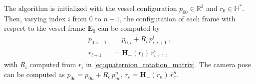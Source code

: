 \begin{algorithm}
The algorithm is initialized with the vessel configuration $p_{00} \in \mathbb{R}^3$ and $r_0 \in \mathbb{H}^*$. 
Then, varying index $i$ from $0$ to $n-1$, the configuration of each frame with respect to the vessel frame $\mathbf{E}_0$ can be computed by
%
%
\begin{align}
p_{0,i+1} &= p_{0,i} + R_{i} \, p^i_{i,i+1} \,, \\
\overline{r}_{i+1} &= \mathbf{H}_+(r_i) \, \overline{r}^i_{i+1} \,,
\end{align}
%
with $R_i$ computed from $r_i$ in \eqref{eq:quaternion_rotation_matrix}.
The camera pose can be computed as $p_{0c} = p_{0n} + R_{c} \, p^n_{nc}$, $r_c = \mathbf{H}_+(r_n) \, \overline{r}^n_{c}$.
%
\end{algorithm}



